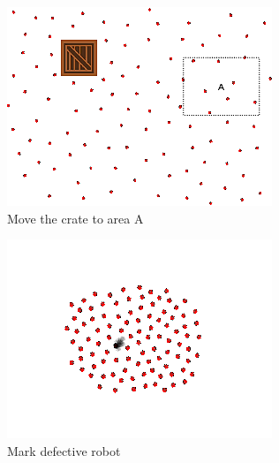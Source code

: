 \documentclass[]{article}
\begin{document}
\begin{figure}
\begin{subfigure}{0.42\textwidth}
		\includegraphics[width=\linewidth]{slide_images/Swarm_Robot_Control_-_100_Robot_0027.png}
		\caption{Move the crate to area A}
		\label{fig:sub2}
	\end{subfigure}%
	\begin{subfigure}{0.42\textwidth}
		\centering
		\includegraphics[width=\linewidth]{slide_images/Swarm_Robot_Control_-_100_Robot_0029.png}
		\caption{Mark defective robot}
		\label{fig:sub1}
	\end{subfigure}
	\begin{subfigure}{0.42\textwidth}
		\centering

\end{subfigure}
\end{figure}
\end{document}
